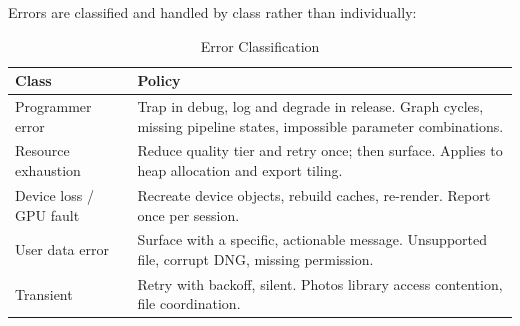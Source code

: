 Errors are classified and handled by class rather than individually:

\begin{table}[htbp]
\caption{Error Classification}
\label{tab:errors}
\begin{center}
\renewcommand{\arraystretch}{1.15}
\begin{tabularx}{\columnwidth}{@{}l>{\raggedright\arraybackslash}X@{}}
\toprule
\textbf{Class} & \textbf{Policy} \\
\midrule
Programmer error & Trap in debug, log and degrade in release. Graph cycles, missing pipeline states, impossible parameter combinations. \\
Resource exhaustion & Reduce quality tier and retry once; then surface. Applies to heap allocation and export tiling. \\
Device loss / GPU fault & Recreate device objects, rebuild caches, re-render. Report once per session. \\
User data error & Surface with a specific, actionable message. Unsupported file, corrupt DNG, missing permission. \\
Transient & Retry with backoff, silent. Photos library access contention, file coordination. \\
\bottomrule
\end{tabularx}
\end{center}
\end{table}
